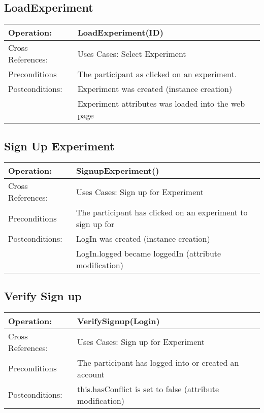 \subsection{LoadExperiment}
\begin{tabular}{|l|l|}
\hline Operation: & LoadExperiment(ID) \\ 
\hline Cross References: & Uses Cases: Select Experiment \\ 
\hline Preconditions & The participant as clicked on an experiment. \\ 
\hline Postconditions: & Experiment was created (instance creation) \\
\hline & Experiment attributes was loaded into the web page \\
\hline 
\end{tabular}

\subsection{Sign Up Experiment}
\begin{tabular}{|l|l|}
\hline Operation: & SignupExperiment() \\ 
\hline Cross References: & Uses Cases: Sign up for Experiment \\ 
\hline Preconditions & The participant has clicked on an experiment to sign up for \\ 
\hline Postconditions: & LogIn was created (instance creation) \\
\hline & LogIn.logged became loggedIn (attribute modification) \\
\hline 
\end{tabular}

\subsection{Verify Sign up}
\begin{tabular}{|l|l|}
\hline Operation: & VerifySignup(Login) \\ 
\hline Cross References: & Uses Cases: Sign up for Experiment \\ 
\hline Preconditions & The participant has logged into or created an account \\ 
\hline Postconditions: & this.hasConflict is set to false (attribute modification) \\
\hline 
\end{tabular}

